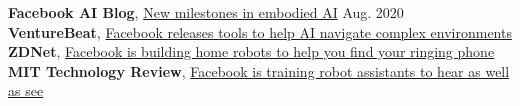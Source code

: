\documentclass[margin, 10pt]{res} %
\begin{document}
\begin{resume}
\textbf{Facebook AI Blog}, \href{https://ai.facebook.com/blog/new-milestones-in-embodied-ai}{New milestones in embodied AI} \hfill Aug. 2020\\
\textbf{VentureBeat}, \href{https://venturebeat.com/2020/08/21/facebook-releases-tools-to-help-ai-navigate-complex-environments}{Facebook releases tools to help AI navigate complex environments} \\
\textbf{ZDNet}, \href{https://www.zdnet.com/article/facebook-is-building-robots-to-help-you-find-your-ringing-phone}{Facebook is building home robots to help you find your ringing phone} \\
\textbf{MIT Technology Review}, \href{https://www.technologyreview.com/2020/08/21/1007523/facebook-ai-robot-assistants-hear-and-see}{Facebook is training robot assistants to hear as well as see}


\end{resume}
\end{document}
